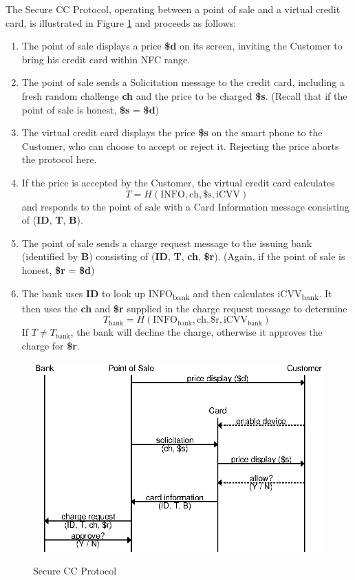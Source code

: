 The Secure CC Protocol, operating between a point of sale and a virtual credit card, is illustrated in Figure \ref{fig:secure-ccp} and proceeds as follows:

\begin{enumerate}
\item The point of sale displays a price \textbf{\$d} on its screen, inviting the Customer to bring his credit card within NFC range.
\item The point of sale sends a Solicitation message to the credit card, including a fresh random challenge \textbf{ch} and the price to be charged \textbf{\$s}.
	(Recall that if the point of sale is honest, \textbf{\$s} = \textbf{\$d})
\item The virtual credit card displays the price \textbf{\$s} on the smart phone to the Customer, who can choose to accept or reject it.
	Rejecting the price aborts the protocol here.
\item If the price is accepted by the Customer, the virtual credit card calculates
	$$T = H(\text{INFO}, \text{ch}, \text{\$s}, \text{iCVV})$$
	and responds to the point of sale with a Card Information message consisting of (\textbf{ID}, \textbf{T}, \textbf{B}).
\item The point of sale sends a charge request message to the issuing bank (identified by \textbf{B}) consisting of (\textbf{ID}, \textbf{T}, \textbf{ch}, \textbf{\$r}).
	(Again, if the point of sale is honest, \textbf{\$r} = \textbf{\$d})
\item The bank uses \textbf{ID} to look up INFO\textsubscript{bank} and then calculates iCVV\textsubscript{bank}.
	It then uses the \textbf{ch} and \textbf{\$r} supplied in the charge request message to determine
	$$T_{\text{bank}} = H(\text{INFO}_{\text{bank}}, \text{ch}, \text{\$r}, \text{iCVV}_{\text{bank}})$$
	If $T \neq T_{\text{bank}}$, the bank will decline the charge, otherwise it approves the charge for \textbf{\$r}.
\end{enumerate}

\begin{figure}
  \caption{Secure CC Protocol}
  \centering
    \includegraphics{img/secure_ccp.eps}
  \label{fig:secure-ccp}
\end{figure}

